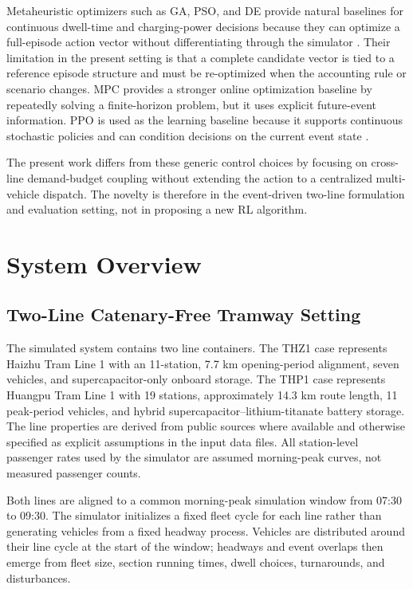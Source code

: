 \documentclass[conference]{IEEEtran}
\newcommand{\thz}{THZ1}
\newcommand{\thp}{THP1}
\begin{document}
Metaheuristic optimizers such as GA, PSO, and DE provide natural baselines for continuous dwell-time and charging-power decisions because they can optimize a full-episode action vector without differentiating through the simulator \cite{holland1975adaptation,kennedy1995pso,storn1997de}. Their limitation in the present setting is that a complete candidate vector is tied to a reference episode structure and must be re-optimized when the accounting rule or scenario changes. MPC provides a stronger online optimization baseline by repeatedly solving a finite-horizon problem, but it uses explicit future-event information. PPO is used as the learning baseline because it supports continuous stochastic policies and can condition decisions on the current event state \cite{schulman2017ppo}.

The present work differs from these generic control choices by focusing on cross-line demand-budget coupling without extending the action to a centralized multi-vehicle dispatch. The novelty is therefore in the event-driven two-line formulation and evaluation setting, not in proposing a new RL algorithm.

\section{System Overview}
\subsection{Two-Line Catenary-Free Tramway Setting}
The simulated system contains two line containers. The \thz{} case represents Haizhu Tram Line 1 with an 11-station, 7.7 km opening-period alignment, seven vehicles, and supercapacitor-only onboard storage. The \thp{} case represents Huangpu Tram Line 1 with 19 stations, approximately 14.3 km route length, 11 peak-period vehicles, and hybrid supercapacitor--lithium-titanate battery storage. The line properties are derived from public sources where available and otherwise specified as explicit assumptions in the input data files. All station-level passenger rates used by the simulator are assumed morning-peak curves, not measured passenger counts.

Both lines are aligned to a common morning-peak simulation window from 07:30 to 09:30. The simulator initializes a fixed fleet cycle for each line rather than generating vehicles from a fixed headway process. Vehicles are distributed around their line cycle at the start of the window; headways and event overlaps then emerge from fleet size, section running times, dwell choices, turnarounds, and disturbances.
\end{document}
